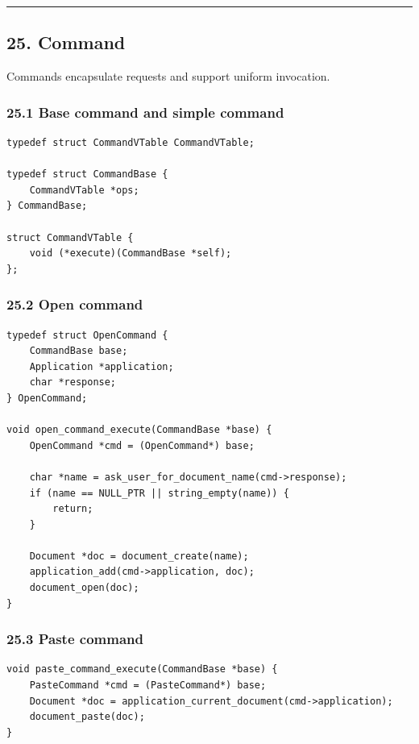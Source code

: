 \documentclass[11pt]{article}
\begin{document}
\begin{center}\rule{0.5\linewidth}{0.5pt}\end{center}

\subsection{25. Command}\label{command}

Commands encapsulate requests and support uniform invocation.

\subsubsection{25.1 Base command and simple command}\label{base-command-and-simple-command}

\begin{verbatim}
typedef struct CommandVTable CommandVTable;

typedef struct CommandBase {
    CommandVTable *ops;
} CommandBase;

struct CommandVTable {
    void (*execute)(CommandBase *self);
};
\end{verbatim}

\subsubsection{25.2 Open command}\label{open-command}

\begin{verbatim}
typedef struct OpenCommand {
    CommandBase base;
    Application *application;
    char *response;
} OpenCommand;

void open_command_execute(CommandBase *base) {
    OpenCommand *cmd = (OpenCommand*) base;

    char *name = ask_user_for_document_name(cmd->response);
    if (name == NULL_PTR || string_empty(name)) {
        return;
    }

    Document *doc = document_create(name);
    application_add(cmd->application, doc);
    document_open(doc);
}
\end{verbatim}

\subsubsection{25.3 Paste command}\label{paste-command-1}

\begin{verbatim}
void paste_command_execute(CommandBase *base) {
    PasteCommand *cmd = (PasteCommand*) base;
    Document *doc = application_current_document(cmd->application);
    document_paste(doc);
}
\end{verbatim}
\end{document}
